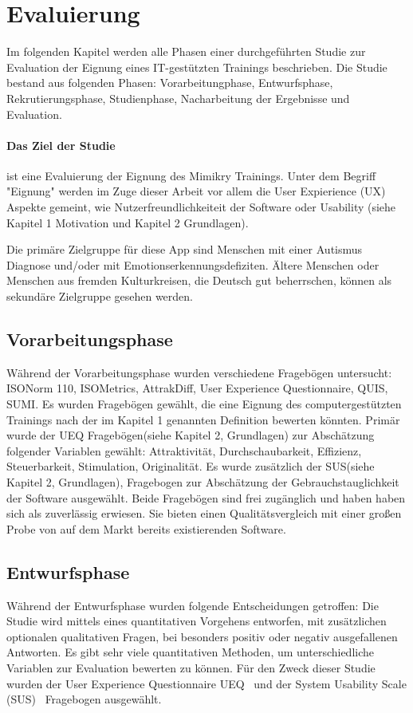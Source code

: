 \section{Evaluierung}
Im folgenden Kapitel werden alle Phasen einer durchgeführten Studie zur Evaluation der Eignung eines IT-gestützten Trainings beschrieben. Die Studie bestand aus folgenden Phasen: Vorarbeitungphase, Entwurfsphase, Rekrutierungsphase, Studienphase, Nacharbeitung der Ergebnisse und Evaluation.

\paragraph{Das Ziel der Studie} ist eine Evaluierung der Eignung des Mimikry Trainings. Unter dem Begriff "Eignung" werden im Zuge dieser Arbeit vor allem die User Expierience (UX) Aspekte gemeint, wie Nutzerfreundlichkeiteit der Software oder Usability (siehe Kapitel 1 Motivation und Kapitel 2 Grundlagen).

Die primäre Zielgruppe für diese App sind Menschen mit einer Autismus Diagnose und/oder mit Emotionserkennungsdefiziten. Ältere Menschen oder Menschen aus fremden Kulturkreisen, die Deutsch gut beherrschen, können als sekundäre Zielgruppe gesehen werden.

\subsection{Vorarbeitungsphase}
Während der Vorarbeitungsphase wurden verschiedene Fragebögen untersucht: ISONorm 110, ISOMetrics, AttrakDiff, User Experience Questionnaire, QUIS, SUMI. Es wurden Fragebögen gewählt, die eine Eignung des computergestützten Trainings nach der im Kapitel 1 genannten Definition bewerten könnten. Primär wurde der UEQ Fragebögen(siehe Kapitel 2, Grundlagen) zur Abschätzung folgender Variablen gewählt: Attraktivität, Durchschaubarkeit, Effizienz, Steuerbarkeit, Stimulation, Originalität.  Es wurde zusätzlich der SUS(siehe Kapitel 2, Grundlagen), Fragebogen zur Abschätzung der Gebrauchstauglichkeit der Software ausgewählt. Beide Fragebögen sind frei zugänglich und haben haben sich als zuverlässig erwiesen. Sie bieten einen Qualitätsvergleich mit einer großen Probe von auf dem Markt bereits existierenden Software.

\subsection{Entwurfsphase}
Während der Entwurfsphase wurden folgende Entscheidungen getroffen:
Die Studie wird mittels eines quantitativen Vorgehens entworfen, mit zusätzlichen optionalen qualitativen Fragen, bei besonders positiv oder negativ ausgefallenen Antworten.
Es gibt sehr viele quantitativen Methoden, um unterschiedliche Variablen zur Evaluation bewerten zu können. Für den Zweck dieser Studie wurden der User Experience Questionnaire UEQ~\cite{UEQ} und der System Usability Scale (SUS)~\cite{SUS} Fragebogen ausgewählt.
